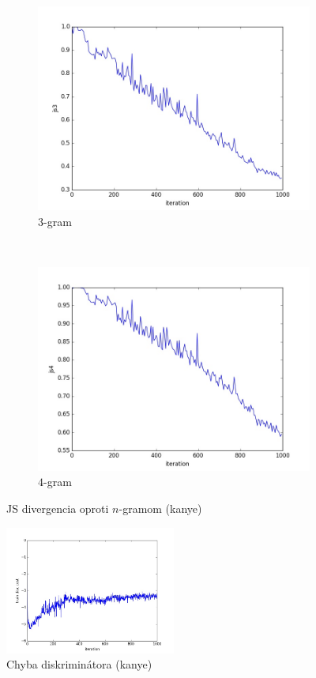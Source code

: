 \documentclass[10pt,a4paper]{article}
\begin{document}
\begin{figure}[H]
    \begin{subfigure}[b]{0.4\textwidth}
        \includegraphics[width=\textwidth]{kanye/js3}
        \caption{$3$-gram}
    \end{subfigure}
    ~ 
    \begin{subfigure}[b]{0.4\textwidth}
        \includegraphics[width=\textwidth]{kanye/js4}
        \caption{$4$-gram}
    \end{subfigure}
    \caption{JS divergencia oproti $n$-gramom (kanye)}\label{fig:animals}
\end{figure}
\begin{figure}[H]
	\centering
	\includegraphics[width=0.5\textwidth]{kanye/train_disc_cost}
    \caption{Chyba diskriminátora (kanye) }
\end{figure}
\end{document}
